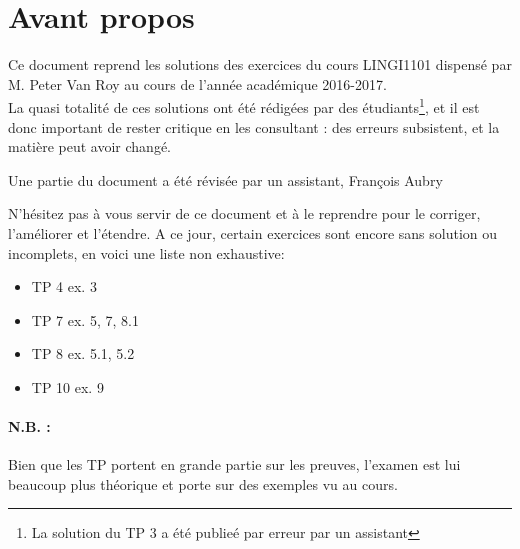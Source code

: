 \section*{Avant propos}
Ce document reprend les solutions des exercices du cours LINGI1101 dispensé par M. Peter Van Roy au cours de l'année académique 2016-2017.\\
La quasi totalité de ces solutions ont été rédigées par des étudiants\footnote{La solution du TP 3 a été publieé par erreur par un assistant}, et il est donc important de rester critique en les consultant : des erreurs subsistent, et la matière peut avoir changé.

Une partie du document a été révisée par un assistant, François Aubry

N'hésitez pas à vous servir de ce document et à le reprendre pour le corriger, l'améliorer et l'étendre.
A ce jour, certain exercices sont encore sans solution ou incomplets, en voici une liste non exhaustive:
\begin{itemize}
	\item TP 4 ex. 3
	\item TP 7 ex. 5, 7, 8.1
	\item TP 8 ex. 5.1, 5.2
	\item TP 10 ex. 9
\end{itemize}

\paragraph{\large{N.B. :}} Bien que les TP portent en grande partie sur les preuves, l'examen est lui beaucoup plus théorique et porte sur des exemples vu au cours.